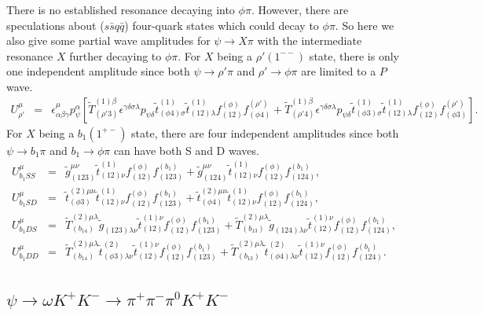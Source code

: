 There is no established resonance decaying into $\phi\pi$.
However, there are speculations about ($s\bar sq\bar q$)
four-quark states which could decay to $\phi\pi$. So here we also
give some partial wave amplitudes for $\psi\to X\pi$ with the
intermediate resonance $X$ further decaying to $\phi\pi$. For $X$
being a  $\rho'(1^{--})$ state, there is only one independent
amplitude since both $\psi\to\rho'\pi$ and $\rho'\to\phi\pi$ are
limited to a $P$ wave.
\begin{eqnarray}
U^\mu_{\rho'} \!&=&\!
\epsilon^\mu_{\alpha\beta\gamma}p_\psi^\alpha
        [\tilde T^{(1)\beta}_{(\rho'3)}
\epsilon^{\gamma\delta\sigma\lambda}p_{\psi\delta} \tilde
t^{(1)}_{(\phi 4)\sigma} \tilde t^{(1)}_{(12)\lambda}
            f_{(12)}^{(\phi)} f_{(\phi 4)}^{(\rho')}
 + \tilde T^{(1)\beta}_{(\rho'4)}
\epsilon^{\gamma\delta\sigma\lambda}p_{\psi\delta}\tilde
t^{(1)}_{(\phi 3)\sigma} \tilde t^{(1)}_{(12)\lambda}
            f_{(12)}^{(\phi)} f_{(\phi 3)}^{(\rho')}].
\end{eqnarray}
For $X$ being a $b_1(1^{+-})$ state, there are four independent amplitudes
since both $\psi\to b_1\pi$ and $b_1\to\phi\pi$ can have both S and D waves.
\begin{eqnarray}
U^\mu_{b_1SS}  \!&=&\! \tilde g_{(123)}^{\mu\nu}\tilde
t^{(1)}_{(12)\nu}
            f_{(12)}^{(\phi)} f_{(123)}^{(b_1)} +
                 \tilde g_{(124)}^{\mu\nu}\tilde t^{(1)}_{(12)\nu}
            f_{(12)}^{(\phi)} f_{(124)}^{(b_1)} ,\\
U^\mu_{b_1SD} \!&=&\! \tilde t_{(\phi3)}^{(2)\mu\nu}\tilde
t^{(1)}_{(12)\nu}
            f_{(12)}^{(\phi)} f_{(123)}^{(b_1)} +
                 \tilde t_{(\phi 4)}^{(2)\mu\nu}\tilde t^{(1)}_{(12)\nu}
            f_{(12)}^{(\phi)} f_{(124)}^{(b_1)} ,\\
U^\mu_{b_1DS} \!&=&\! \tilde T_{(b_14)}^{(2)\mu\lambda}\tilde
g_{(123)\lambda\nu}
            \tilde t^{(1)\nu}_{(12)}
            f_{(12)}^{(\phi)} f_{(123)}^{(b_1)} +
                 \tilde T_{(b_13)}^{(2)\mu\lambda} \tilde g_{(124)\lambda\nu}
              \tilde t^{(1)\nu}_{(12)}
            f_{(12)}^{(\phi)} f_{(124)}^{(b_1)} ,\\
U^\mu_{b_1DD} \!&=&\! \tilde T_{(b_14)}^{(2)\mu\lambda} \tilde
t^{(2)}_{(\phi 3)\lambda\nu}\tilde t^{(1)\nu}_{(12)}
f_{(12)}^{(\phi)} f_{(123)}^{(b_1)}+ \tilde
T_{(b_13)}^{(2)\mu\lambda} \tilde t^{(2)}_{(\phi 4)\lambda\nu}
\tilde t^{(1)\nu}_{(12)} f_{(12)}^{(\phi)} f_{(124)}^{(b_1)} .
\end{eqnarray}

\subsection{$\psi\to\omega K^+K^-\to\pi^+\pi^-\pi^0K^+K^-$}

